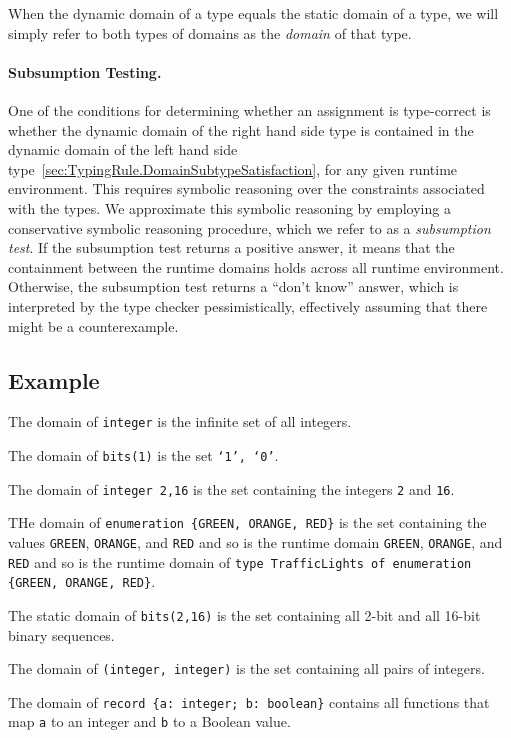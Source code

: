 \documentclass{book}
\begin{document}
  When the dynamic domain of a type equals the static domain of a type, we will simply refer to both
  types of domains as the \emph{domain} of that type.

  \paragraph{Subsumption Testing.}
  One of the conditions for determining whether an assignment is type-correct is whether the dynamic domain of the
  right hand side type is contained in the dynamic domain of the left hand side type~\ref{sec:TypingRule.DomainSubtypeSatisfaction},
  for any given runtime environment.
  This requires symbolic reasoning over the constraints associated with the types.
  We approximate this symbolic reasoning by employing a conservative symbolic reasoning procedure,
  which we refer to as a \emph{subsumption test}.
  If the subsumption test returns a positive answer, it means that the containment between the runtime domains holds across all
  runtime environment.
  Otherwise, the subsumption test returns a ``don't know'' answer, which is interpreted by the type checker pessimistically,
  effectively assuming that there might be a counterexample.

  \subsection{Example}
  The domain of \texttt{integer} is the infinite set of all integers.

  The domain of \texttt{bits(1)} is the set \texttt{{‘1’, ‘0’}}.

  The domain of \texttt{integer {2,16}} is the set containing the integers \texttt{2} and \texttt{16}.

  THe domain of \texttt{enumeration \{GREEN, ORANGE, RED\}} is the set containing the values
  \texttt{GREEN}, \texttt{ORANGE}, and \texttt{RED} and so is the runtime domain
  \texttt{GREEN}, \texttt{ORANGE}, and \texttt{RED} and so is the runtime domain
  of \texttt{type TrafficLights of enumeration \{GREEN, ORANGE, RED\}}.

  The static domain of \texttt{bits({2,16})} is the set containing all 2-bit and all 16-bit binary sequences.

  The domain of \texttt{(integer, integer)} is the set containing all pairs of integers.

  The domain of \texttt{record \{a: integer;  b: boolean\}} contains all functions that map \texttt{a} to an integer and \texttt{b} to a Boolean value.
\end{document}
